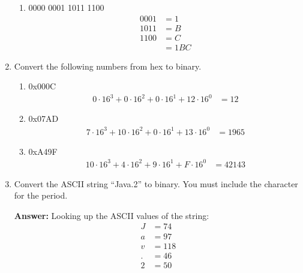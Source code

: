 \documentclass[12pt]{article}
\begin{document}
\begin{enumerate}
\begin{enumerate}
      \item 0000 0001 1011 1100
      \begin{align*}
        0001 &= 1 \\
        1011 &= B \\
        1100 &= C \\
        &= 1BC
      \end{align*}
    \end{enumerate}

    \item Convert the following numbers from hex to binary.
    \begin{enumerate}
      \item 0x000C
      \begin{align*}
        0 \cdot 16^3 + 0 \cdot 16^2 + 0 \cdot 16^1 + 12 \cdot 16^0 &= 12
      \end{align*}

      \item 0x07AD
      \begin{align*}
        7 \cdot 16^3 + 10 \cdot 16^2 + 0 \cdot 16^1 + 13 \cdot 16^0 &= 1965
      \end{align*}

      \item 0xA49F
      \begin{align*}
        10 \cdot 16^3 + 4 \cdot 16^2 + 9 \cdot 16^1 + F \cdot 16^0 &= 42143
      \end{align*}
    \end{enumerate}

    \item Convert the ASCII string “Java.2” to binary. You must include the character for the period.

    \textbf{Answer:}
    Looking up the ASCII values of the string:
    \begin{align*}
      J &= 74 \\
      a &= 97 \\
      v &= 118 \\
      . &= 46 \\
      2 &= 50
    \end{align*}


\end{enumerate}
\end{document}
